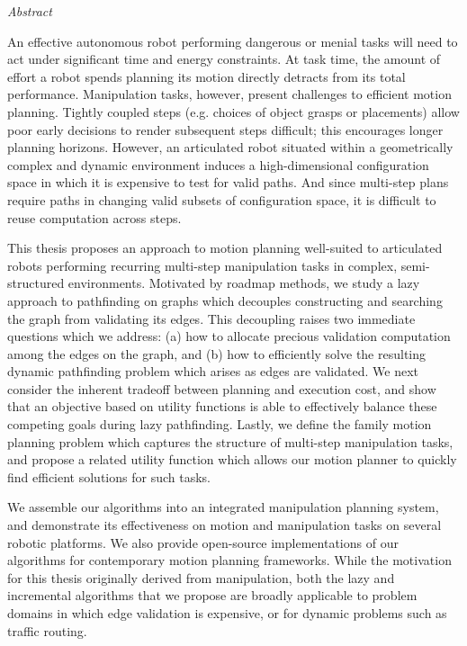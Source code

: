 
\begin{fullwidth}
\begin{adjustwidth}{1in}{1in}

{\LARGE \emph{Abstract}}

\vspace{0.2in}

An effective autonomous robot performing dangerous or menial tasks
will need to act under significant time and energy constraints.
At task time,
the amount of effort a robot spends planning its motion directly
detracts from its total performance.
Manipulation tasks, however, present challenges
to efficient motion planning.
Tightly coupled steps (e.g. choices of object grasps or placements)
allow poor early decisions to render subsequent steps difficult;
this encourages longer planning horizons.
However,
an articulated robot
situated within a geometrically complex and dynamic environment
induces a high-dimensional configuration space
in which it is expensive to test for valid paths.
And since multi-step plans
require paths in changing valid subsets of configuration space,
it is difficult to reuse computation across steps.

\vspace{0.2cm}

This thesis proposes an approach to motion planning
well-suited to articulated robots
performing recurring multi-step manipulation tasks
in complex, semi-structured environments.
Motivated by roadmap methods,
we study a lazy approach to pathfinding on graphs
which decouples constructing and searching the graph
from validating its edges.
This decoupling raises two immediate questions which we address:
(a) how to allocate precious validation computation
among the edges on the graph,
and (b) how to efficiently solve the resulting dynamic pathfinding
problem which arises as edges are validated.
We next consider the inherent tradeoff
between planning and execution cost,
and show that an objective based on utility functions
is able to effectively balance these competing goals
during lazy pathfinding.
Lastly,
we define the family motion planning problem
which captures the structure of multi-step manipulation tasks,
and propose a related utility function which allows our
motion planner to quickly find efficient solutions for such tasks.

\vspace{0.2cm}

We assemble our algorithms into an integrated manipulation planning
system,
and demonstrate its effectiveness on motion and manipulation tasks
on several robotic platforms.
We also provide open-source implementations of our algorithms
for contemporary motion planning frameworks.
While the motivation for this thesis originally derived
from manipulation,
both the lazy and incremental algorithms that we propose
are broadly applicable to problem domains
in which edge validation is expensive,
or for dynamic problems such as traffic routing.


\end{adjustwidth}
\end{fullwidth}
